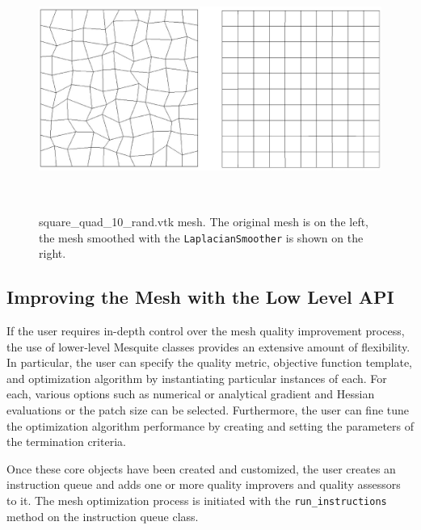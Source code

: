 \begin{figure}[htbp]
\begin{center}
    \includegraphics[height=80mm]{square_rand.eps}
    \caption{square\_quad\_10\_rand.vtk mesh. The original mesh is on the left, the mesh smoothed with the \texttt{LaplacianSmoother} is shown on the right.}
    \label{fig:square_rand}
\end{center}
\end{figure}


\subsection{Improving the Mesh with the Low Level API}
\label{sec:tutDetailedAPI}
If the user requires in-depth control over the mesh quality improvement
process, the use of lower-level Mesquite classes provides an extensive
amount of flexibility.   In particular, the user can specify the quality
metric, objective function template, and optimization algorithm by
instantiating particular instances of each.  For each, various options
such as numerical or analytical gradient and Hessian evaluations or
the patch size can be selected.  Furthermore, the user can fine tune
the optimization algorithm performance by creating and setting the parameters 
of the termination criteria.

Once these core objects have been created and customized, the user
creates an instruction queue and adds one or more quality improvers
and quality assessors to it.  The mesh optimization process is initiated
with the {\tt run\_instructions} method on the instruction queue
class.

